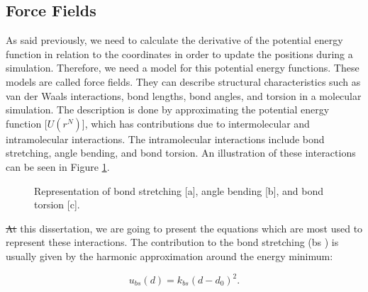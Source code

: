 \documentclass[
	12pt,				%
	openany,			%
	oneside,			%
	a4paper,			%
	english,			%
	brazil				%
	]{abntex2}
\providecommand{\DIFadd}[1]{{\protect\color{blue}\uwave{#1}}}
\providecommand{\DIFdel}[1]{{\protect\color{red}\sout{#1}}}
\providecommand{\DIFaddbegin}{}
\providecommand{\DIFaddend}{}
\providecommand{\DIFdelbegin}{}
\providecommand{\DIFdelend}{}
\providecommand{\DIFadd}[1]{{\protect\color{blue}\uwave{#1}}} %
\providecommand{\DIFdel}[1]{{\protect\color{red}\sout{#1}}}                      %
\providecommand{\DIFaddbegin}{} %
\providecommand{\DIFaddend}{} %
\providecommand{\DIFdelbegin}{} %
\providecommand{\DIFdelend}{} %
\begin{document}
\DIFdelend \DIFaddbegin \FloatBarrier
\DIFaddend \subsection{Force Fields }
As said previously, we need to calculate the derivative of the potential energy function in relation to the coordinates in order to update the positions during a simulation. Therefore, we need a model for this potential energy functions. These models are called force fields. They can describe structural characteristics such as van der Waals interactions, bond lengths, bond angles, and torsion in a molecular simulation. The description is done by approximating the potential energy function [$U(r^N)$], which has contributions due to intermolecular and intramolecular interactions. The intramolecular interactions include bond stretching, angle bending, and bond torsion. An illustration of these interactions can be seen in Figure \ref{fig:intraint}. 

\begin{figure}[H]
	\caption{Representation of bond stretching [a], angle bending [b], and bond torsion [c].}%
	\label{fig:intraint}%
\end{figure}


\DIFdelbegin \DIFdel{At }\DIFdelend \DIFaddbegin \DIFadd{In }\DIFaddend this dissertation, we are going to present the equations which are most used to represent these interactions. The contribution to the bond stretching (bs ) is usually given by the harmonic approximation around the energy minimum:

\begin{equation}
u_{bs}(d) = k_{bs} (d - d_{0})^2 .
\end{equation}
\end{document}
